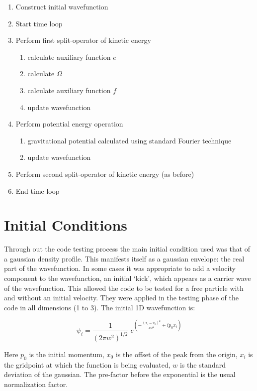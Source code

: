 \begin{enumerate}
\item Construct initial wavefunction
\item Start time loop
\item Perform first split-operator of kinetic energy
\begin{enumerate}
\item calculate auxiliary function $e$
\item calculate $\Omega$
\item calculate auxiliary function $f$
\item update wavefunction
\end{enumerate}
\item Perform potential energy operation
\begin{enumerate}
\item gravitational potential calculated using standard Fourier technique
\item update wavefunction
\end{enumerate}
\item Perform second split-operator of kinetic energy (as before)
\item End time loop
\end{enumerate}


\section{Initial Conditions}
Through out the code testing process the main initial condition used was that of a gaussian density profile. This manifests itself as a gaussian envelope: the real part of the wavefunction.  In some cases it was appropriate to add a velocity component to the wavefunction, an initial `kick', which appears as a carrier wave of the wavefunction. This allowed the code to be tested for a free particle with and without an initial velocity. They were applied in the testing phase of the code in all dimensions (1 to 3). The initial 1D wavefunction is:

\begin{equation}
\psi_i = \frac{1}{(2\pi w^2)^{1/2}} \;  e^ {\left( -\frac{(x_i-x_0)^2}{4 w^2} + i p_0 x_i \right)}
\end{equation}

\noindent Here $p_0$ is the initial momentum, $x_0$ is the offset of the peak from the origin, $x_i$ is the gridpoint at which the function is being evaluated, $w$ is the standard deviation of the gaussian. The pre-factor before the exponential is the usual normalization factor.

